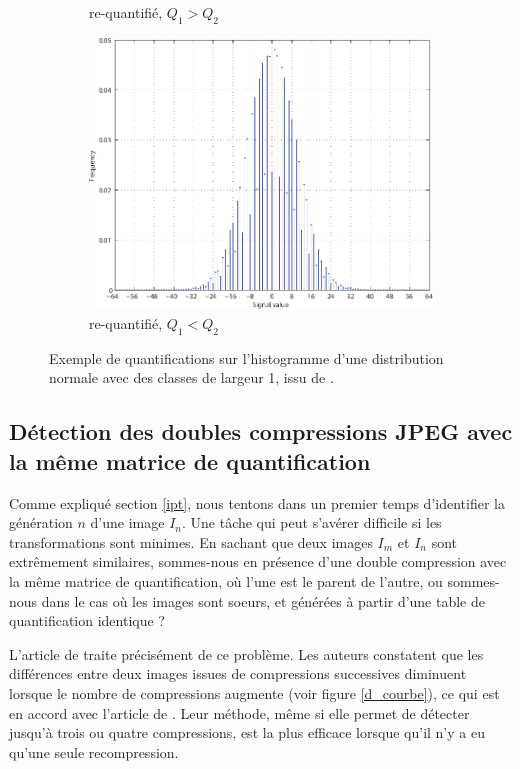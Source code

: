 \documentclass[utf8,final]{stageM2R} %
\begin{document}
\begin{figure}
\begin{subfigure}{.33\textwidth}
    \caption{re-quantifié, $Q_{1} > Q_{2}$}
    \label{hb}
  \end{subfigure}
  \begin{subfigure}{.33\textwidth}
    \centering
    \includegraphics[width=\linewidth]{images/h3}
    \caption{re-quantifié, $Q_{1} < Q_{2}$}
    \label{hc}
  \end{subfigure}
  \caption{Exemple de quantifications sur l'histogramme d'une distribution normale avec des classes de largeur 1, issu de \autocite{feng2010jpeg}.}
  \label{fig:histo}
\end{figure}

\subsection{Détection des doubles compressions JPEG avec la même matrice de quantification}
Comme expliqué section \ref{ipt}, nous tentons dans un premier temps d'identifier la génération $n$ d'une image $I_{n}$. Une tâche qui peut s'avérer difficile si les transformations sont minimes. En sachant que deux images $I_{m}$ et $I_{n}$ sont extrêmement similaires, sommes-nous en présence d'une double compression avec la même matrice de quantification, où l'une est le parent de l'autre, ou sommes-nous dans le cas où les images sont soeurs, et générées à partir d'une table de quantification identique ?

L'article de  \autocite{huang2010detecting} traite précisément de ce problème. Les auteurs constatent que les différences entre deux images issues de compressions successives diminuent lorsque le nombre de compressions augmente (voir figure \ref{d_courbe}), ce qui est en accord avec l'article de  \autocite{lai2013block}. Leur méthode, même si elle permet de détecter jusqu'à trois ou quatre compressions, est la plus efficace lorsque qu'il n'y a eu qu'une seule recompression.
\end{document}
